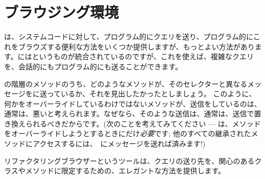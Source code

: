 \documentclass[a4paper,10pt,twoside]{book}
\begin{document}
\section{ブラウジング環境}

は、システムコードに対して、プログラム的にクエリを送り、プログラム的にこれをブラウズする便利な方法をいくつか提供しますが、もっとよい方法があります。\pharo{}にはというものが統合されているのですが、これを使えば、複雑なクエリを、会話的にもプログラム的にも送ることができます。

の階層のメソッドのうち、どのようなメソッドが、そのセレクターと異なるメッセージを\super{}に送っているか、それを見出したかったとしましょう。
このように、何かをオーバーライドしているわけではないメソッドが、\super{}送信をしているのは、通常は、悪いと考えられます。なぜなら、そのような\super{}送信は、通常は、\self{}送信で置き換えられるべきだからです。(次のことを考えてみてください --- \super は、メソッドをオーバーライドしようとするときにだけ\emph{必要}です; 他のすべての継承されたメソッドにアクセスするには、\self　にメッセージを送れば済みます!)

リファクタリングブラウザーというツールは、クエリの送り先を、関心のあるクラスやメソッドに限定するための、エレガントな方法を提供します。
\end{document}
